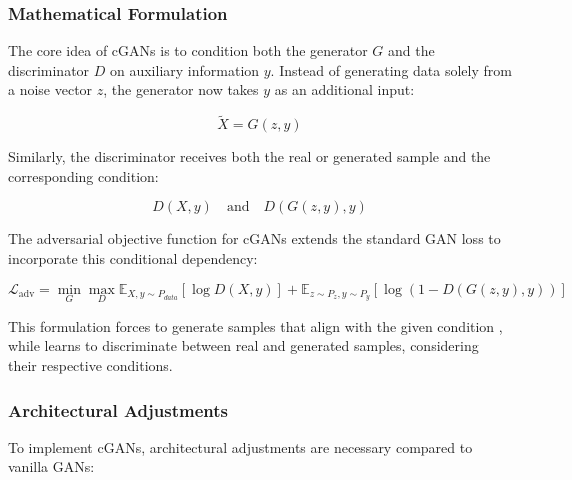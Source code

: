 \subsubsection{Mathematical Formulation}
\label{theoretical_cgan_math}
The core idea of cGANs is to condition both the generator \(G\) and the discriminator \(D\) on auxiliary information \(y\). Instead of generating data solely from a noise vector \(z\), the generator now takes \(y\) as an additional input:

\begin{equation}
\tilde{X} = G(z, y)
\end{equation}


\noindent
Similarly, the discriminator receives both the real or generated sample and the corresponding condition:

\begin{equation}
D(X, y) \quad \text{and} \quad D(G(z, y), y)
\end{equation}

\noindent
The adversarial objective function for cGANs extends the standard GAN loss to incorporate this conditional dependency:

\begin{equation}\label{theory_gan_cond_formula}
\mathcal{L}_{\text{adv}} = \min_G \max_D \mathbb{E}_{X, y \sim P_{data}} [\log D(X, y)] + \mathbb{E}_{z \sim P_z, y \sim P_y} [\log (1 - D(G(z, y), y))]
\end{equation}

\noindent
This formulation forces to generate samples that align with the given condition , while  learns to discriminate between real and generated samples, considering their respective conditions.

\subsubsection{Architectural Adjustments}
\label{theory_cgan_architecture}
To implement cGANs, architectural adjustments are necessary compared to vanilla GANs:

